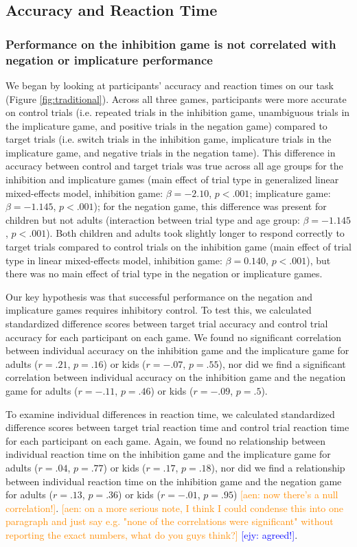 \documentclass[10pt,letterpaper]{article}
\newcommand{\ejy}[1]{\textcolor{Blue}{[ejy: #1]}}
\newcommand{\aen}[1]{\textcolor{DarkOrange}{[aen: #1]}}
\begin{document}
\subsection{Accuracy and Reaction Time}

\subsubsection{Performance on the inhibition game is not correlated with negation or implicature performance}

We began by looking at participants' accuracy and reaction times on our task (Figure \ref{fig:traditional}).  Across all three games, participants were more accurate on control trials (i.e. repeated trials in the inhibition game, unambiguous trials in the implicature game, and positive trials in the negation game) compared to target trials (i.e. switch trials in the inhibition game, implicature trials in the implicature game, and negative trials in the negation tame).  This difference in accuracy between control and target trials was true across all age groups for the inhibition and implicature games (main effect of trial type in generalized linear mixed-effects model, inhibition game: $\beta = -2.10$, $p< .001$; implicature game: $\beta = -1.145$, $p< .001$); for the negation game, this difference was present for children but not adults (interaction between trial type and age group: $\beta = -1.145$, $p< .001$).  Both children and adults took slightly longer to respond correctly to target trials compared to control trials on the inhibition game (main effect of trial type in linear mixed-effects model, inhibition game: $\beta = 0.140$, $p< .001$), but there was no main effect of trial type in the negation or implicature games.  

Our key hypothesis was that successful performance on the negation and implicature games requires inhibitory control.  To test this, we calculated standardized difference scores between target trial accuracy and control trial accuracy for each participant on each game.  We found no significant correlation between individual accuracy on the inhibition game and the implicature game for adults ($r = .21$, $p = .16$) or kids  ($r = -.07$, $p = .55$), nor did we find a significant correlation between individual accuracy on the inhibition game and the negation game for adults  ($r = -.11$, $p = .46$) or kids  ($r = -.09$, $p = .5$).  

To examine individual differences in reaction time, we calculated standardized difference scores between target trial reaction time and control trial reaction time for each participant on each game.  Again, we found no relationship between individual reaction time on the inhibition game and the implicature game for adults  ($r = .04$, $p = .77$) or kids  ($r = .17$, $p = .18$), nor did we find a relationship between individual reaction time on the inhibition game and the negation game for adults  ($r = .13$, $p = .36$) or kids ($r = -.01$, $p = .95$) \aen{now there's a null correlation!}.  \aen{on a more serious note, I think I could condense this into one paragraph and just say e.g. "none of the correlations were significant" without reporting the exact numbers, what do you guys think?} \ejy{agreed!}.
\end{document}

